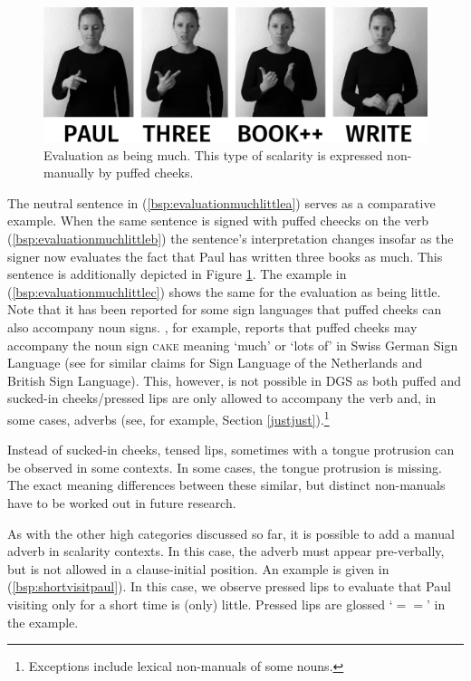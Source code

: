\begin{figure}[bt]
\centering
	\includegraphics[width=1.0\textwidth]{evalmuchsw.jpg}
	\caption{Evaluation as being much. This type of scalarity is expressed non-manually by puffed cheeks.}
	\label{fig:evalgood}
\end{figure}

\noindent The neutral sentence in (\ref{bsp:evaluationmuchlittlea}) serves as a comparative example. When the same sentence is signed with puffed cheecks on the verb (\ref{bsp:evaluationmuchlittleb}) the sentence's interpretation changes insofar as the signer now evaluates the fact that Paul has written three books as much. This sentence is additionally depicted in Figure \ref{fig:evalgood}. The example in (\ref{bsp:evaluationmuchlittlec}) shows the same for the evaluation as being little. Note that it has been reported for some sign languages that puffed cheeks can also accompany noun signs. \citet[102--103]{boyesbram1990gebaerdesprache}, for example, reports that puffed cheeks may accompany the noun sign \textsc{cake} meaning `much' or `lots of' in Swiss German Sign Language (see \citealt{bakerpfau2016} for similar claims for Sign Language of the Netherlands and British Sign Language). This, however, is not possible in DGS as both puffed and sucked-in cheeks/pressed lips are only allowed to accompany the verb and, in some cases, adverbs (see, for example, Section \ref{justjust}).\footnote{ Exceptions include lexical non-manuals of some nouns.}

Instead of sucked-in cheeks, tensed lips, sometimes with a tongue protrusion can be observed in some contexts. In some cases, the tongue protrusion is missing. The exact meaning differences between these similar, but distinct non-manuals have to be worked out in future research. 

As with the other high categories discussed so far, it is possible to add a manual adverb in scalarity contexts. In this case, the adverb must appear pre-verbally, but is not allowed in a clause-initial position. An example is given in (\ref{bsp:shortvisitpaul}). In this case, we observe pressed lips to evaluate that Paul visiting only for a short time is (only) little. Pressed lips are glossed `$==$' in the example.

